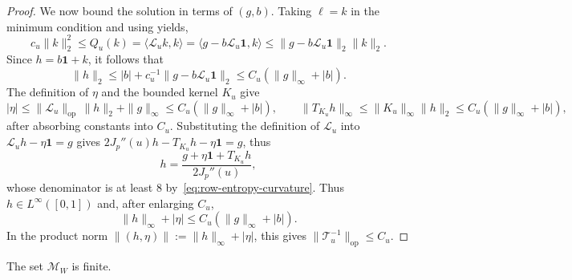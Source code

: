 \begin{proof}
We now bound the solution in terms of $(g,b)$. Taking $\ell=k$ in the
minimum condition and using  yields,
\[
  c_u\|k\|_2^2\le Q_u(k)
  =\langle \mathcal L_uk,k\rangle
  =\langle g-b\mathcal L_u\mathbf1,k\rangle
  \le\|g-b\mathcal L_u\mathbf1\|_2\|k\|_2.
\]
Since $h=b\mathbf1+k$, it follows that
\[
  \|h\|_2\le |b|+c_u^{-1}\|g-b\mathcal L_u\mathbf1\|_2
  \le C_u(\|g\|_\infty+|b|).
\]
The definition of $\eta$ and the bounded kernel $K_u$ give
\[
  |\eta|\le\|\mathcal L_u\|_{\mathrm{op}}\,\|h\|_2+\|g\|_\infty \le C_u(\|g\|_\infty+|b|),
  \qquad \|T_{K_u}h\|_\infty\le\|K_u\|_\infty\|h\|_2 \le C_u(\|g\|_\infty+|b|),
\]
after absorbing constants into $C_u$.
Substituting the definition of $\mathcal L_u$ into
$\mathcal L_uh-\eta\mathbf1=g$ gives $2J_p''(u)h-T_{K_u}h-\eta\mathbf1=g$, thus
\[
  h=\frac{g+\eta\mathbf1+T_{K_u}h}{2J_p''(u)},
\]
whose denominator is at least $8$ by~\eqref{eq:row-entropy-curvature}.
Thus $h\in L^\infty([0,1])$ and, after enlarging $C_u$,
\[
  \|h\|_\infty+|\eta|\le C_u(\|g\|_\infty+|b|).
\]
In the product norm $\|(h,\eta)\|:=\|h\|_\infty+|\eta|$, this gives
$\|\mathcal T_u^{-1}\|_{\mathrm{op}}\le C_u$.
\end{proof}

\begin{lemma}\label{lem:row-finite}
The set $\mathcal M_W$ is finite.
\end{lemma}

